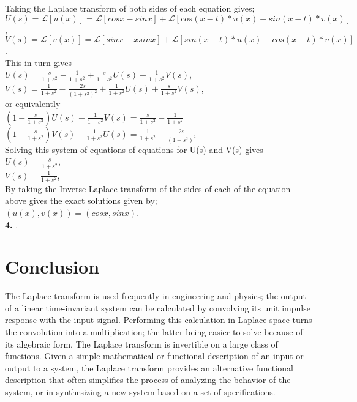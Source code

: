 \documentclass[12pt]{article}
\begin{document}
{ Taking the Laplace transform of both sides of each equation gives;\\

$U(s) = \mathcal{L}[u(x)] = \mathcal{L}[cosx - sinx] + \mathcal{L}[cos(x - t) * u(x) + sin(x - t) * v(x)]$,\\

$V(s) = \mathcal{L}[v(x)] = \mathcal{L}[sinx - xsinx] + \mathcal{L}[sin(x - t) * u(x) - cos(x - t) * v(x)]$.\\

This in turn gives\\

$U(s) = \frac{s}{1 + s^2} - \frac{1}{1 + s^2} + \frac{s}{1 + s^2}U(s) + \frac{1}{1 + s^2}V(s)$,\\

$V(s) = \frac{1}{1 + s^2} - \frac{2s}{(1 + s^2)^2} + \frac{1}{1 + s^2}U(s) + \frac{s}{1 + s^2}V(s)$,\\

or equivalently\\

$(1 - \frac{s}{1+s^2})U(s) - \frac{1}{1+s^2}V(s) = \frac{s}{1 + s^2} - \frac{1}{1 + s^2}$\\

$(1 - \frac{s}{1+s^2})V(s) - \frac{1}{1+s^2}U(s) = \frac{1}{1 + s^2} - \frac{2s}{(1 + s^2)^2}$\\

Solving this system of equations of equations for U(s) and V(s) gives\\

$U(s) = \frac{s}{1+s^2}$,\\

$V(s) = \frac{1}{1+s^2}$,\\

By taking the Inverse Laplace transform of the sides of each of the equation above gives the exact solutions given by;\\

$(u(x), v(x)) =(cosx, sinx)$.\\

\textbf{4.} $$.\\

\newpage
\section{Conclusion}
The Laplace transform is used frequently in engineering and physics; the output of a linear time-invariant system can be calculated by convolving its unit impulse response with the input signal. Performing this calculation in Laplace space turns the convolution into a multiplication; the latter being easier to solve because of its algebraic form. The Laplace transform is invertible on a large class of functions. Given a simple mathematical or functional description of an input or output to a system, the Laplace transform provides an alternative functional description that often simplifies the process of analyzing the behavior of the system, or in synthesizing a new system based on a set of specifications.

}
\end{document}
